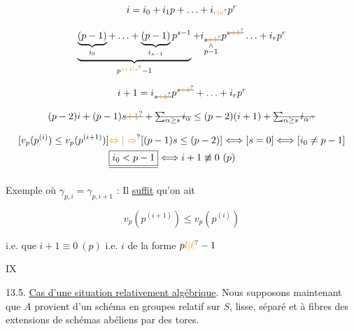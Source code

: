 \[
 i=i_0+i_1p+\ldots+i_{\unsure{r|v}}p^r
\]

  

\[
 \underbrace{\underbrace{(p-1)}_{i_0}+\ldots+\underbrace{(p-1)}_{i_{s-1}}p^{s-1}}_{p^{\unsure{s+1|s}}-1}
 +\underset{\substack{\wedge\\p-1}}{i_{s\deleted{\unsure{+1}}}}p^{s\deleted{\unsure{+1}}}\ldots+i_r p^r
\]

\[
 i+1=i_{s\deleted{\unsure{+1}}}p^{s\deleted{\unsure{+1}}}+\ldots+i_rp^r
\]

\[
 (p-2)i+(p-1)s\deleted{\unsure{+1}}+\deleted{\sum_{\alpha\geq s}i_\alpha}
 \leq(p-2)(i+1)+\deleted{\sum_{\alpha\geq s}i_{\alpha\unsure{\prime}}}
\]

\[
\begin{aligned}
 [v_p(p^{(i)})\leq v_p(p^{(i+1)})]&\unsure{\Leftrightarrow|\Rightarrow}
 [(p-1)s\leq(p-2)]\Longleftrightarrow[s=0]\Longleftrightarrow[i_0\ne p-1]\\
 &\deleted{\boxed{i_0<p-1}}\Longleftrightarrow i+1\not\equiv0\ (p)
\end{aligned}
\]

Exemple où $\gamma_{p,i}=\gamma_{p,i+1}$ : Il \uline{suffit} qu'on ait 

\[
 v_p(p^{(i+1)})\leq v_p(p^{(i)})
\]

i.e. que \quad{} $i+1\equiv0\ (p)$ i.e. $i$ de la forme $p\unsure{l|\ell}-1$



IX

13.5. \uline{Cas d'une situation relativement algébrique}. Nous supposons maintenant que $A$ provient d'un schéma en groupes relatif sur $S$, lisse, séparé et à fibres des extensions de schémas abéliens par des tores.

